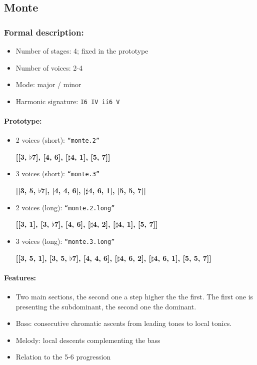 ﻿\documentclass[11pt, openany]{article}
\begin{document}
\begin{itemize}
	\subsection{Monte}
	
\subsubsection{Formal description:}
\begin{itemize}
\item Number of stages: 4; fixed in the prototype
\item Number of voices: 2-4
\item Mode: major / minor
\item Harmonic signature: \texttt{I6 IV ii6 V}
\end{itemize}

\paragraph{Prototype:}
\begin{itemize}
\item 2 voices (short): \texttt{“monte.2”}
	\begin{center}
	\textbf{[[3, $\flat$7], [4, 6], [$\sharp$4, 1], [5, 7]]}
	\end{center}
\item 3 voices (short): \texttt{“monte.3”}
	\begin{center}
	\textbf{[[3, 5, $\flat$7], [4, 4, 6], [$\sharp$4, 6, 1], [5, 5, 7]]}
	\end{center}
\item 2 voices (long): \texttt{“monte.2.long”}
	\begin{center}
	\textbf{[[3, 1], [3, $\flat$7], [4, 6], [$\sharp$4, 2], [$\sharp$4, 1], [5, 7]]}
	\end{center}
\item 3 voices (long): \texttt{“monte.3.long”}
	\begin{center}
	\textbf{[[3, 5, 1], [3, 5, $\flat$7], [4, 4, 6], [$\sharp$4, 6, 2], [$\sharp$4, 6, 1], [5, 5, 7]]}
	\end{center}
\end{itemize}

\paragraph{Features:}
\begin{itemize}
\item Two main sections, the second one a step higher the the first. The first one is presenting the subdominant, the second one the dominant.
\item Bass: consecutive chromatic ascents from leading tones to local tonics.
\item Melody: local descents complementing the bass
\item Relation to the 5-6 progression
\end{itemize}


\end{itemize}
\end{document}

